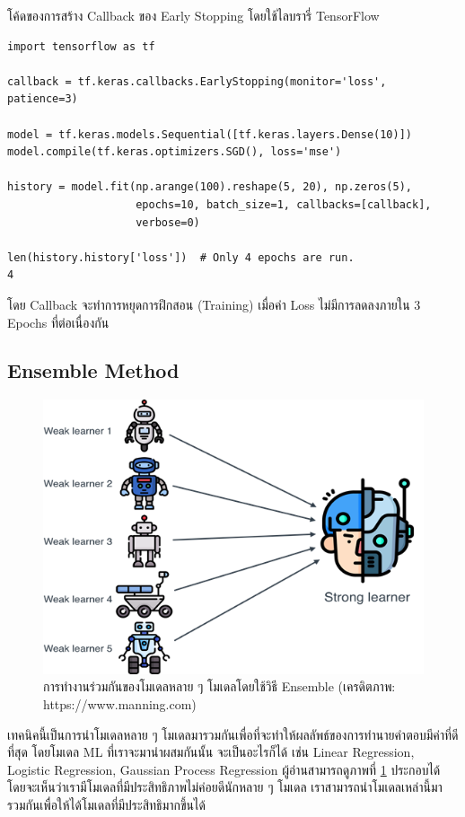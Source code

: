 \noindent โค้ดของการสร้าง Callback ของ Early Stopping โดยใช้ไลบรารี่ TensorFlow 

\begin{lstlisting}[style=MyPython]
import tensorflow as tf

callback = tf.keras.callbacks.EarlyStopping(monitor='loss', patience=3)

model = tf.keras.models.Sequential([tf.keras.layers.Dense(10)])
model.compile(tf.keras.optimizers.SGD(), loss='mse')

history = model.fit(np.arange(100).reshape(5, 20), np.zeros(5),
                    epochs=10, batch_size=1, callbacks=[callback],
                    verbose=0)

len(history.history['loss'])  # Only 4 epochs are run.
4
\end{lstlisting}

\noindent โดย Callback จะทำการหยุดการฝึกสอน (Training) เมื่อค่า Loss ไม่มีการลดลงภายใน 3 Epochs ที่ต่อเนื่องกัน

\subsection{Ensemble Method}
\label{ssec:ensemble_model}

\begin{figure}[htbp]
    \centering
    \includegraphics[width=0.9\linewidth]{fig/ensemble_method.png}
    \caption{การทำงานร่วมกันของโมเดลหลาย ๆ โมเดลโดยใช้วิธี Ensemble (เครดิตภาพ: https://www.manning.com)}
    \label{fig:ensemble_method}
\end{figure}

เทคนิคนี้เป็นการนำโมเดลหลาย ๆ โมเดลมารวมกันเพื่อที่จะทำให้ผลลัพธ์ของการทำนายคำตอบมีค่าที่ดีที่สุด โดยโมเดล ML ที่เราจะมานำผสมกันนั้น%
จะเป็นอะไรก็ได้ เช่น Linear Regression, Logistic Regression, Gaussian Process Regression ผู้อ่านสามารถดูภาพที่ 
\ref{fig:ensemble_method} ประกอบได้ โดยจะเห็นว่าเรามีโมเดลที่มีประสิทธิภาพไม่ค่อยดีนักหลาย ๆ โมเดล เราสามารถนำโมเดลเหล่านี้มา%
รวมกันเพื่อให้ได้โมเดลที่มีประสิทธิมากขึ้นได้

